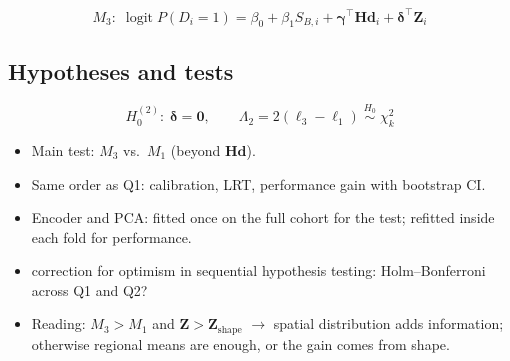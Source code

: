 \begin{equation}
    M_3:\; \operatorname{logit} P(D_i = 1) = \beta_0 + \beta_1 S_{B,i} + \boldsymbol{\gamma}^{\top}\mathbf{Hd}_i + \boldsymbol{\delta}^{\top}\mathbf{Z}_i
\end{equation}

\subsection{Hypotheses and tests}
\begin{equation}
    H_0^{(2)}:\; \boldsymbol{\delta} = \mathbf{0},
    \qquad
    \Lambda_2 = 2\left(\ell_3 - \ell_1\right) \;\overset{H_0}{\sim}\; \chi^2_{k}
\end{equation}
\begin{itemize}
    \item Main test: $M_3$ vs.\ $M_1$ (beyond $\mathbf{Hd}$). 
    \item Same order as Q1: calibration, LRT, performance gain with bootstrap CI.
    \item Encoder and PCA: fitted once on the full cohort for the test; refitted inside each fold for performance.
    \item correction for optimism in sequential hypothesis testing: Holm--Bonferroni across Q1 and Q2? 
    \item Reading: $M_3 > M_1$ and $\mathbf{Z} > \mathbf{Z}_{\text{shape}}$ $\rightarrow$ spatial distribution adds information; otherwise regional means are enough, or the gain comes from shape.
\end{itemize}


